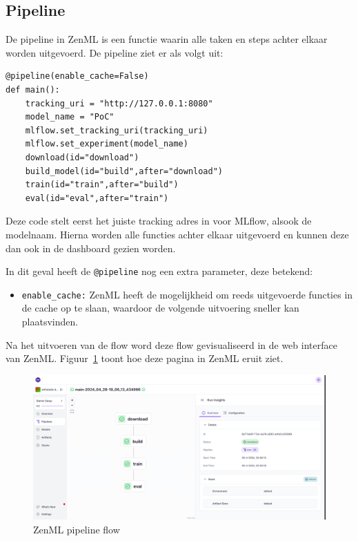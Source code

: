 \subsection{Pipeline}
De pipeline in ZenML is een functie waarin alle taken en steps achter elkaar worden uitgevoerd. De pipeline ziet er als volgt uit:
\begin{verbatim}
@pipeline(enable_cache=False)
def main():
    tracking_uri = "http://127.0.0.1:8080"
    model_name = "PoC"
    mlflow.set_tracking_uri(tracking_uri)
    mlflow.set_experiment(model_name)
    download(id="download")
    build_model(id="build",after="download")
    train(id="train",after="build")
    eval(id="eval",after="train")
\end{verbatim}
Deze code stelt eerst het juiste tracking adres in voor MLflow, alsook de modelnaam. Hierna worden alle functies achter elkaar uitgevoerd en kunnen deze dan ook in de dashboard gezien worden.

In dit geval heeft de \texttt{@pipeline} nog een extra parameter, deze betekend:

\begin{itemize}
    \item \texttt{enable\_cache:} ZenML heeft de mogelijkheid om reeds uitgevoerde functies in de cache op te slaan, waardoor de volgende uitvoering sneller kan plaatsvinden.
\end{itemize}

Na het uitvoeren van de flow word deze flow gevisualiseerd in de web interface van ZenML. Figuur~\ref{fig:ZenML_Pipeline_Flow} toont hoe deze pagina in ZenML eruit ziet.
\begin{figure}
    \centering
    \includegraphics[width=0.9\linewidth]{graphics/ZenML_Pipeline_Flow.PNG}
    \caption{ZenML pipeline flow}
    \label{fig:ZenML_Pipeline_Flow}
\end{figure}
